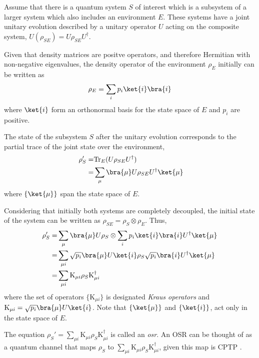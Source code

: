 Assume that there is a quantum system $S$ of interest which is a subsystem of a larger system which also includes an environment $E$. These systems have a joint unitary evolution described by a unitary operator $U$ acting on the composite system, $U (\rho_{SE} )= U \rho_{SE} U^{\dag}$. 

Given that density matrices are positve operators, and therefore Hermitian with non-negative eigenvalues, the density operator of the environment $\rho_E$ initially can be written as 
\begin{equation*}
  \rho_E = \sum_{i} p_{i} \ket{i} \bra{i}
\end{equation*}
where $\ket{i}$ form an orthonormal basis for the state space of $E$ and $p_{i}$ are positive. 

The state of the subsystem $S$ after the unitary evolution corresponds to the partial trace of the joint state over the environment,
\begin{align*}
  \rho_{S}' = & \text{Tr}_{E}(U \rho_{SE} U^{\dag}) \\
 = & \sum_{\mu} \bra{\mu} U \rho_{SE} U^{\dag} \ket{\mu}
\end{align*}
where $\{\ket{\mu}\}$ span the state space of $E$.

 
Considering that initially both systems are completely decoupled, the initial state of the system can be written as $ \rho_{SE} = \rho_{S} \otimes \rho_{E}$. Thus,
\begin{align*} 
  \rho_{S}' = & \sum_{\mu} \bra{\mu} U \rho_{S} \otimes \sum_{i} p_{i} \ket{i} \bra{i} U^{\dag} \ket{\mu} \\
  = & \sum_{\mu i}  \sqrt{p_{i}} \bra{\mu} U \ket{i} \rho_{S} \sqrt{p_{i}} \bra{i} U^{\dag} \ket{\mu}  \\ 
  = & \sum_{\mu i} \text{K}_{\mu i} \rho_{S} \text{K}_{\mu i}^{\dag}
\end{align*}
where the set of operators $\{\text{K}_{\mu i}\}$ is designated \emph{Kraus operators} and $\text{K}_{\mu i} = \sqrt{p_{i}} \bra{\mu} U \ket{i}$. Note that $\{\ket{\mu}\}$ and $\{\ket{i}\}$, act only in the state space of $E$. 

\begin{definition}
  The equation $ \rho_{S}' = \sum_{\mu i} \text{K}_{\mu i} \rho_{S} \text{K}_{\mu i}^{\dag} $ is called an \emph{\acrfull{osr}}. An OSR can be thought of as a quantum channel that maps $\rho_{S}$ to $\sum_{\mu i} \text{K}_{\mu i} \rho_{S} \text{K}_{\mu i}^{\dag}$, given this map is CPTP \cite{lidar2019lecture, watrous2018theory}. 
\end{definition}




